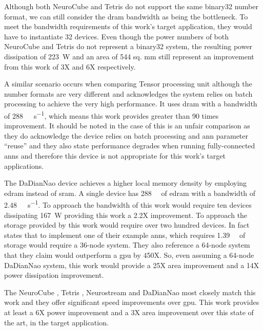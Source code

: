 Although both NeuroCube \cite{kim2016neurocube} and Tetris \cite{gao2017tetris} do not support the same \ac{binary32} number format, we can still consider the \ac{dram} bandwidth as being the bottleneck. 
To meet the bandwidth requirements of this work's target application, they would have to instantiate 32 devices.
Even though the power numbers of both NeuroCube \cite{kim2016neurocube} and Tetris \cite{gao2017tetris} do not represent a \ac{binary32} system, 
the resulting power dissipation of \SI[per-mode=symbol]{223}{\watt} and an area of 544 sq. mm still represent an improvement from this work of 3X and 6X respectively.

A similar scenario occurs when comparing Tensor processing unit \cite{jouppi2017datacenter} although the number formats are very different and \cite{jouppi2017datacenter} acknowledges the system relies on batch processing to achieve the very high performance.
It uses \ac{dram} with a bandwidth of \SI[per-mode=symbol]{288}{\giga\bit\per\second}, which means this work provides greater than 90 times improvement. 
It should be noted in the case of \cite{jouppi2017datacenter} this is an unfair comparison as they do acknowledge the device relies on batch processing and \ac{ann} parameter ``reuse'' and they also state performance degrades when running fully-connected \acp{ann} and therefore this device is not appropriate for this work's target applications.

The DaDianNao \cite{chen2016diannao} device achieves a higher local memory density by employing \ac{edram} instead of \ac{sram}. A single device has \SI[per-mode=symbol]{288}{\giga\bit} of \ac{edram} with a bandwidth of \SI[per-mode=symbol]{2.48}{\tera\bit\per\second}.
To approach the bandwidth of this work would require ten devices dissipating \SI[per-mode=symbol]{167}{\watt} providing this work a 2.2X improvement.
To approach the storage provided by this work would require over two hundred devices. 
In fact \cite{chen2016diannao} states that to implement one of their example \acp{ann}, which requires \SI[per-mode=symbol]{1.39}{\giga\byte} of storage would require a 36-node system. 
They also reference a 64-node system that they claim would outperform a \ac{gpu} by 450X.
So, even assuming a 64-node DaDianNao system, this work would provide a 25X area improvement and a 14X power dissipation improvement.

The NeuroCube \cite{kim2016neurocube}, Tetris \cite{gao2017tetris}, Neurostream \cite{azarkhish2017neurostream} and DaDianNao \cite{chen2016diannao} most closely match this work and they offer significant speed improvements over \ac{gpu}.
This work provides at least a 6X power improvement and a 3X area improvement over this state of the art, in the target application.



